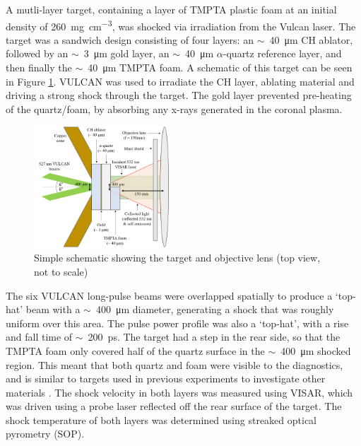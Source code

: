 A mutli-layer target, containing a layer of TMPTA plastic foam at an initial density of 260~\unit{\milli\gram\per\centi\meter\cubed}, was shocked via irradiation from the Vulcan laser. The target was a sandwich design consisting of four layers: an $\sim$~40~\si[per-mode=symbol]{\micro\meter} CH ablator, followed by an $\sim$~3~\si[per-mode=symbol]{\micro\meter} gold layer, an $\sim$~40~\si[per-mode=symbol]{\micro\meter} $\alpha$-quartz reference layer, and then finally the $\sim$~40~\si[per-mode=symbol]{\micro\meter} TMPTA foam. A schematic of this target can be seen in Figure \ref{fig:target}. VULCAN was used to irradiate the CH layer, ablating material and driving a strong shock through the target. The gold layer prevented pre-heating of the quartz/foam, by absorbing any x-rays generated in the coronal plasma.

\begin{figure}
\centering
\includegraphics[width=0.45\textwidth]{figures/Experiment/TargetSchematic.png}%
\caption{\label{fig:target} Simple schematic showing the target and objective lens (top view, not to scale)}
\end{figure}

The six VULCAN long-pulse beams were overlapped spatially to produce a `top-hat' beam with a $\sim$~400~\unit{\micro\meter} diameter, generating a shock that was roughly uniform over this area. The pulse power profile was also a `top-hat', with a rise and fall time of $\sim$~200~\unit{\pico\second}. The target had a step in the rear side, so that the TMPTA foam only covered half of the quartz surface in the $\sim$~400~\unit{\micro\meter} shocked region. This meant that both quartz and foam were visible to the diagnostics, and is similar to targets used in previous experiments to investigate other materials \cite{Falk2014a, Falk2020}. The shock velocity in both layers was measured using VISAR, which was driven using a probe laser reflected off the rear surface of the target. The shock temperature of both layers was determined using streaked optical pyrometry (SOP).

